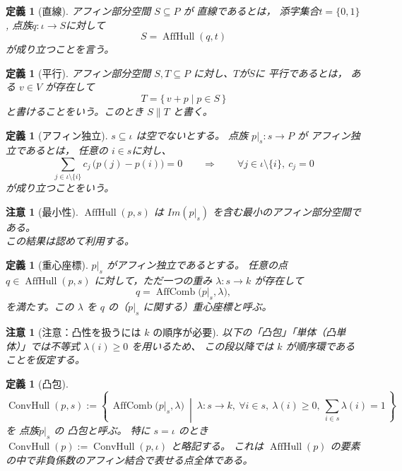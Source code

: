 \documentclass[a4paper,12pt]{bxjsbook}
\theoremstyle{theorem}
\newtheorem{definition}[theorem]{定義}
\newtheorem{remark}[theorem]{注意}
\DeclareMathOperator{\AffHull}{AffHull}
\DeclareMathOperator{\AffComb}{AffComb}
\DeclareMathOperator{\ConvHull}{ConvHull}
\begin{document}
    \begin{definition}[直線]
        アフィン部分空間 $S\subseteq P$ が \emph{直線}であるとは，
        添字集合$t=\{0,1\}$, 点族$q:\iota\to S$に対して
        \[
        S = \AffHull(q,t)
        \]
        が成り立つことを言う。
    \end{definition}

    \begin{definition}[平行]
        アフィン部分空間 $S,T\subseteq P$ に対し、$T$が$S$に \emph{平行}であるとは，
        ある $v\in V$ が存在して
        \[
        T=\{\,v+p \mid p\in S\,\}
        \]
        と書けることをいう。このとき $S\parallel T$ と書く。
    \end{definition}

    \begin{definition}[アフィン独立]
        $s\subseteq \iota$ は空でないとする。
        点族 $p|_s:s\to P$ が \emph{アフィン独立}であるとは，
        任意の $i\in s$に対し、
        \[
        \sum_{j\in \iota\setminus\{i\}} c_j\,\bigl(p(j)-p(i)\bigr)=0
        \qquad\Longrightarrow\qquad
        \forall j\in \iota\setminus\{i\},\ c_j=0
        \]
        が成り立つことをいう。
    \end{definition}

    \begin{remark}[最小性]
        $\AffHull(p,s)$ は $Im(p|_s)$ を含む最小のアフィン部分空間である。\\
        この結果は認めて利用する。
    \end{remark}

    \begin{definition}[重心座標]
        $p|_s$ がアフィン独立であるとする。
        任意の点 $q\in \AffHull(p,s)$ に対して，ただ一つの重み $\lambda:s\to k$ が存在して
        \[
          q=\AffComb\bigl(p|_s,\lambda\bigr),
        \]
        を満たす。この $\lambda$ を $q$ の（$p|_s$ に関する）\emph{重心座標}と呼ぶ。
    \end{definition}

    \begin{remark}[注意：凸性を扱うには $k$ の順序が必要]
        以下の「凸包」「単体（凸単体）」では不等式 $\lambda(i)\ge 0$ を用いるため、
        この段以降では $k$ が順序環であることを仮定する。
    \end{remark}

    \begin{definition}[凸包]
        \[
          \ConvHull(p,s):=
          \left\{\,
            \AffComb\bigl(p|_s,\lambda\bigr)
            \ \middle|\
            \lambda:s\to k,\ \forall i\in s,\ \lambda(i)\ge 0,\ \sum_{i\in s}\lambda(i)=1
          \,\right\}
        \]
        を 点族$p|_s$ の \emph{凸包}と呼ぶ。
        特に $s=\iota$ のとき $\ConvHull(p):=\ConvHull(p,\iota)$ と略記する。
        これは $\AffHull(p)$ の要素の中で非負係数のアフィン結合で表せる点全体である。
    \end{definition}
\end{document}
